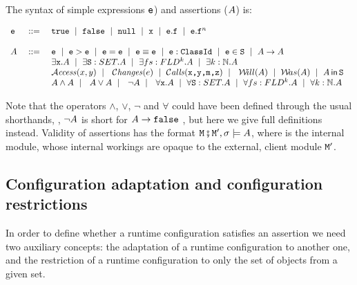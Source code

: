  
\begin{definition}[Assertions]The syntax of simple expressions ${\mbox{\tt{e}}}$) and assertions ($A$) is:
\label{def:assertions}
 
 $\begin{array}{lcl}
  {\mbox{\tt{e}}} & ::= &  {\mbox{\tt{true}}}  \ \mid\ {\mbox{\tt{false}}}  \    \mid\ {\mbox{\tt{null}}}  \ \mid \ {\mbox{\tt{x}}}  \ \mid \ {\mbox{\tt{e}}}.{\mbox{\tt{f}}}    \ \mid \ {\mbox{\tt{e}}}.{\mbox{\tt{f}}}^n \  \\
 ~ \\
A &\ ::=\  &   {\mbox{\tt{e}}}  \ \mid \ {\mbox{\tt{e}}} > {\mbox{\tt{e}}} \ \mid \  {\mbox{\tt{e}}}={\mbox{\tt{e}}}  \ \mid \ {\mbox{\tt{e}}} \equiv {\mbox{\tt{e}}}\ \mid \   {\mbox{\tt{e}}}:{\mbox{\tt{ClassId}}}  \ \mid \   
    {\mbox{\tt{e}}}\in{\mbox{\tt{S}}}   \ \mid  \ A \rightarrow A  \\
 &   &  \exists {\mbox{\tt{x}}}.A  \ \mid \  \exists {\mbox{\tt{S}}}:SET.A  \ \mid \  \exists fs:FLD^k.A
 \ \mid \  \exists k:\mathbb{N}.A  
\\
 &    & {\mathcal{A}}\textrm{\textit{ccess}}(x,y) \ \mid\  \ \mathcal{C}\textrm{\textit{hanges}}(e) \ \mid\  {\mathcal{C}}\textrm{\textit{alls}}({\mbox{\tt{{\mbox{\tt{x}}},{\mbox{\tt{y}}},{\mbox{\tt{m}}},{\mbox{\tt{z}}}}}}) \ \mid\  \  {{\mathcal W}\!ill}(A)  \ \mid \  {{\mathcal W}\!as}(A) \ \mid \ A\,{\bf{\sf {in}}}\, {\mbox{\tt{S }}}
 \\
  &   &  A \wedge A  \ \mid\  \ A \vee A  \ \mid\  \ \neg A   \ \mid\  \ \forall {\mbox{\tt{x}}}.A  \ \mid \  \forall {\mbox{\tt{S}}}:SET.A  \ \mid \  \forall fs:FLD^k.A
 \ \mid \  \forall k:\mathbb{N}.A  
\end{array}$


\end{definition} 

Note that the operators $\wedge$, $\vee$,  $\neg$ and $\forall$  could have been defined  through the usual shorthands, \eg, $\neg A$ is short for 
$A \rightarrow {\mbox{\tt{false}}}$ \etc, but here we give full definitions instead.
 Validity of assertions has the format ${\mbox{\tt{\ensuremath{{\mbox{\tt{M}}}}}}}\fatsemi {\mbox{\tt{\ensuremath{{\mbox{\tt{M}}}}}}}', \sigma \models A$, where  \M is the internal module, whose internal workings
 are opaque to the external, client module ${\mbox{\tt{\ensuremath{{\mbox{\tt{M}}}}}}}'$.

\subsection{Configuration adaptation and configuration restrictions} 
In order to define whether a runtime configuration satisfies an assertion we need two auxiliary concepts: 
the adaptation of a runtime configuration to another one, and the restriction of a runtime configuration to only the set of objects from a 
given set.

